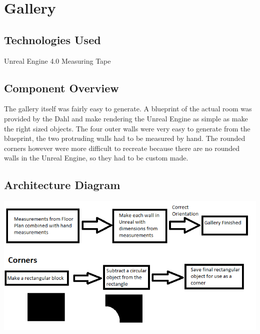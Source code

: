 \section{Gallery }

\subsection{Technologies  Used}
Unreal Engine 4.0
Measuring Tape

\subsection{Component  Overview}
The gallery itself was fairly easy to generate.  A blueprint of the actual room was provided by the Dahl and make rendering the Unreal Engine as simple as make the right sized objects.  The four outer walls were very easy to generate from the blueprint, the two protruding walls had to be measured by hand. The rounded corners however were more difficult to recreate because there are no rounded walls in the Unreal Engine, so they had to be custom made.  


\subsection{ Architecture  Diagram}
\includegraphics[scale=1.0]{Diagrams/GalleryDiagram.png}





